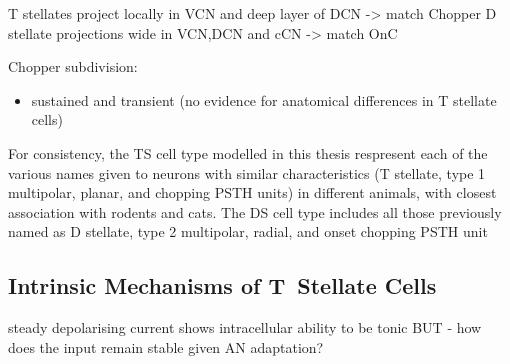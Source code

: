 T stellates project locally in VCN and deep layer of DCN -> match Chopper \citep{RhodeOertelEtAl:1983,SmithRhode:1989}
D stellate projections wide in VCN,DCN and cCN -> match OnC  \citep{SmithRhode:1989}



Chopper subdivision:
\begin{itemize}
\item sustained and transient (no evidence for anatomical differences in T stellate cells)
\end{itemize}




  For consistency, the TS cell type modelled in this thesis respresent each of the
  various names given to neurons with similar characteristics (T stellate, type 1
  multipolar, planar, and chopping PSTH units) in different animals, with closest
  association with rodents and cats. The DS cell type includes all those previously named as D stellate, type 2
  multipolar, radial, and onset chopping PSTH unit



\subsection{Intrinsic Mechanisms of T~Stellate Cells}\label{sec:intr-mech-tstellate} %



steady depolarising current shows intracellular ability to be tonic
\cite{Oertel:1983,OertelWuEtAl:1988} BUT - how does the input remain stable
given AN adaptation?


